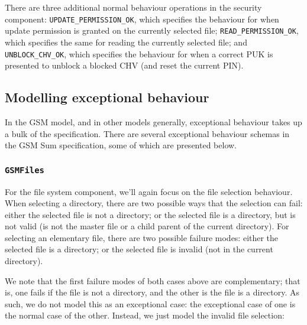 There are three additional normal behaviour operations in the security component: \texttt{UPDATE\_PERMISSION\_OK}, which specifies the behaviour for when update permission is granted on the currently selected file; \texttt{READ\_PERMISSION\_OK}, which specifies the same for reading the currently selected file; and \texttt{UNBLOCK\_CHV\_OK}, which specifies the behaviour for when a correct PUK is presented to unblock a blocked CHV (and reset the current PIN).

\subsection{Modelling exceptional behaviour}

In the GSM model, and in other models generally, exceptional behaviour takes up a bulk of the specification.  There are several exceptional behaviour schemas in the GSM Sum specification, some of which are presented below.

\subsubsection*{\texttt{GSMFiles}}

For the file system component, we'll again focus on the file selection behaviour. When selecting a directory, there are two possible ways that the selection can fail: either the selected file is not a directory; or the selected file is a directory, but  is not valid (is not the master file or a child parent of the current directory). For selecting an elementary file, there are two possible failure modes: either the selected file is a directory; or the selected file is invalid (not in the current directory).

We note that the first failure modes of both cases above are complementary; that is, one fails if the file is not a directory, and the other is the file is a directory. As such, we do not model this as an exceptional case: the exceptional case of one is the normal case of the other. Instead, we just model the invalid file selection:






